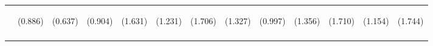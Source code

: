 \begin{tabular}{lcccccccccccc}
 & \begin{footnotesize}(0.886)\end{footnotesize} & \begin{footnotesize}(0.637)\end{footnotesize} & \begin{footnotesize}(0.904)\end{footnotesize} & \begin{footnotesize}(1.631)\end{footnotesize} & \begin{footnotesize}(1.231)\end{footnotesize} & \begin{footnotesize}(1.706)\end{footnotesize} & \begin{footnotesize}(1.327)\end{footnotesize} & \begin{footnotesize}(0.997)\end{footnotesize} & \begin{footnotesize}(1.356)\end{footnotesize} & \begin{footnotesize}(1.710)\end{footnotesize} & \begin{footnotesize}(1.154)\end{footnotesize} & \begin{footnotesize}(1.744)\end{footnotesize}\\
\noalign{\smallskip}\hline\end{tabular}\\
